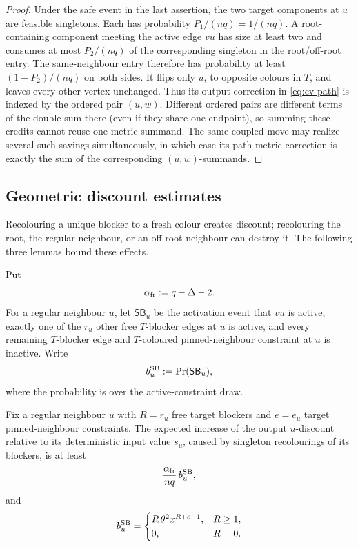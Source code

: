 \begin{proof}
Under the safe event in the last assertion, the two target components at
$u$ are feasible singletons. Each has probability $P_1/(nq)=1/(nq)$. A
root-containing component meeting the active edge $vu$ has size at least two and consumes
at most $P_2/(nq)$ of the corresponding singleton in the root/off-root
entry. The same-neighbour entry therefore has probability at least $(1-P_2)/(nq)$ on both
sides. It flips only $u$, to opposite colours in $T$, and leaves every
other vertex unchanged. Thus its output correction in
\eqref{eq:cv-path} is indexed by the ordered pair $(u,w)$. Different
ordered pairs are different terms of the double sum there (even if they
share one endpoint), so summing these credits cannot reuse one metric
summand. The same coupled move may realize several such savings
simultaneously, in which case its path-metric correction is exactly the sum
of the corresponding $(u,w)$-summands.
\end{proof}

\subsection{Geometric discount estimates}

Recolouring a unique blocker to a fresh colour creates discount; recolouring
the root, the regular neighbour, or an off-root neighbour can destroy it.  The following
three lemmas bound these effects.

Put
\begin{equation}\label{eq:cv-alpha}
  \alpha_{\mathrm{fr}}:=q-\Delta-2 .
\end{equation}
For a regular neighbour \(u\), let \(\mathsf{SB}_u\) be the activation
event that \(vu\) is active, exactly one of the \(r_u\) other free
\(T\)-blocker edges at \(u\) is active, and every remaining \(T\)-blocker
edge and \(T\)-coloured pinned-neighbour constraint at \(u\) is inactive.
Write
\[
  b_u^{\rm SB}:=\Pr(\mathsf{SB}_u),
\]
where the probability is over the active-constraint draw.

\begin{lemma}\label{lem:cv-fresh}
Fix a regular neighbour $u$ with $R=r_u$ free target blockers and \(e=e_u\) target
pinned-neighbour constraints. The expected increase of the output $u$-discount relative
to its deterministic input value $s_u$, caused by singleton recolourings of
its blockers, is at least
\[
  \frac{\alpha_{\mathrm{fr}}}{nq}\,
  b_u^{\rm SB},
\]
and
\[
  b_u^{\rm SB}=
  \begin{cases}
    R\,\theta^2x^{R+e-1},&R\ge1,\\
    0,&R=0.
  \end{cases}
\]
\end{lemma}

